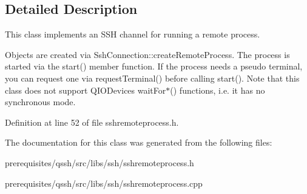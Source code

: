 \subsection{Detailed Description}
This class implements an S\+SH channel for running a remote process. 

Objects are created via Ssh\+Connection\+::create\+Remote\+Process. The process is started via the start() member function. If the process needs a pseudo terminal, you can request one via request\+Terminal() before calling start(). Note that this class does not support Q\+I\+O\+Device\textquotesingle{}s wait\+For$\ast$() functions, i.\+e. it has no synchronous mode. 

Definition at line 52 of file sshremoteprocess.\+h.



The documentation for this class was generated from the following files\+:\begin{DoxyCompactItemize}
\item 
prerequisites/qssh/src/libs/ssh/sshremoteprocess.\+h\item 
prerequisites/qssh/src/libs/ssh/sshremoteprocess.\+cpp\end{DoxyCompactItemize}
